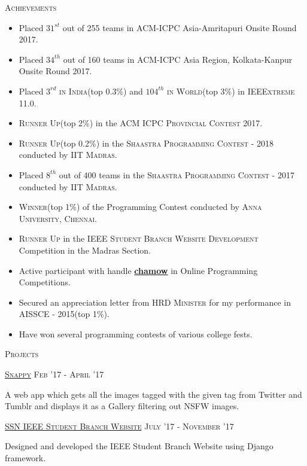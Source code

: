 \documentclass[11pt]{article}
\begin{document}
	{\centering\Large{\textsc{Achievements}} \hrulefill}
		
	\begin{itemize}
	\setlength\itemsep{-0.25em}
	\item Placed \textsc{$31^{st}$} out of 255 teams in \textsc{ACM-ICPC} Asia-Amritapuri Onsite Round 2017.
	\item Placed \textsc{$34^{th}$} out of 160 teams in \textsc{ACM-ICPC} Asia Region, Kolkata-Kanpur Onsite Round 2017.
	\item Placed \textsc{$3^{rd}$ in India}(top 0.3\%) and \textsc{$104^{th}$ in World}(top 3\%) in \textsc{IEEExtreme 11.0}.
	\item \textsc{Runner Up}(top 2\%) in the \textsc{ACM ICPC Provincial Contest 2017}.
	\item \textsc{Runner Up}(top 0.2\%) in the \textsc{Shaastra Programming Contest - 2018} conducted by \textsc{IIT Madras}.
	\item Placed \textsc{$8^{th}$} out of 400 teams in the \textsc{Shaastra Programming Contest - 2017} conducted by \textsc{IIT Madras}.
	\item \textsc{Winner}(top 1\%) of the Programming Contest conducted by \textsc{Anna University, Chennai}.
	\item \textsc{Runner Up} in the \textsc{IEEE Student Branch Website Development} Competition in the Madras Section.
	\item Active participant with handle \textbf{\href{https://www.stopstalk.com/user/profile/chamow}{chamow}} in Online Programming Competitions.	
	\item Secured an appreciation letter from \textsc{HRD Minister} for my performance in \textsc{AISSCE - 2015}(top 1\%).
	\item Have won several programming contests of various college fests.
	
	\end{itemize}
 	
	\vspace{2mm}

	{\centering\Large{\textsc{Projects}} \hrulefill}
		
	\vspace{2mm}
	\large{\textsc{\href{https://chamow97.github.io/snappy/}{Snappy}}}   \hfill \small\textsc{Feb '17 - April '17}
	\begin{itemize}
	\small
	{
	\item A web app which gets all the images tagged with the given tag from Twitter and Tumblr and displays it as a Gallery filtering out NSFW images.
	}
	\end{itemize}	
	\vspace{2mm}
	\large{\textsc{\href{http://ssnieee.herokuapp.com/}{SSN IEEE Student Branch Website}}}   \hfill \small\textsc{July '17 - November '17}
	\begin{itemize}
	\small
	{
	\item Designed and developed the IEEE Student Branch Website using Django framework. 
	}
	\end{itemize}	
	\vspace{3mm}
	
\end{document}
